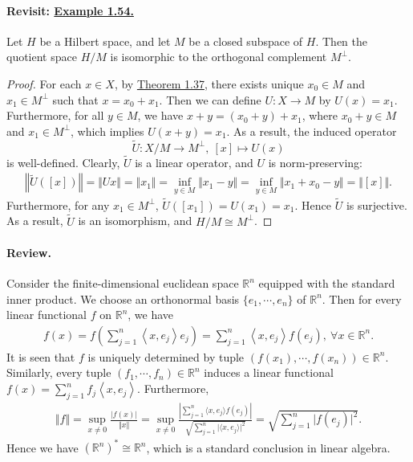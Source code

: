 \documentclass{article}
\begin{document}
\paragraph{Revisit: \hyperref[example:1.54]{Example 1.54.}} Let $H$ be a Hilbert space, and let $M$ be a closed subspace of $H$. Then the quotient space $H/M$ is isomorphic to the orthogonal complement $M^\perp$.
\begin{proof}
For each $x\in X$, by \hyperref[thm:1.37]{Theorem 1.37}, there exists unique $x_0\in M$ and $x_1\in M^\perp$ such that $x=x_0+x_1$. Then we can define $U:X\to M$ by $U(x)=x_1$. Furthermore, for all $y\in M$, we have $x+y=(x_0+y)+x_1$, where $x_0+y\in M$ and $x_1\in M^\perp$, which implies $U(x+y) = x_1$. As a result, the induced operator $$\widetilde{U}:X/M\to M^\perp,\ [x]\mapsto U(x)$$ 
is well-defined. Clearly, $\widetilde{U}$ is a linear operator, and $U$ is norm-preserving:
\begin{align*}
	\left\Vert\widetilde{U}([x])\right\Vert = \Vert Ux\Vert = \Vert x_1\Vert = \inf_{y\in M}\Vert x_1 - y\Vert = \inf_{y\in M}\Vert x_1 + x_0 - y\Vert = \Vert [x]\Vert.
\end{align*}
Furthermore, for any $x_1\in M^\perp$, $\widetilde{U}([x_1]) = U(x_1) = x_1$. Hence $\widetilde{U}$ is surjective. As a result, $\widetilde{U}$ is an isomorphism, and $H/M\cong M^\perp$.
\end{proof}

\paragraph{Review.} Consider the finite-dimensional euclidean space $\mathbb{R}^n$ equipped with the standard inner product. We choose an orthonormal basis $\{e_1,\cdots,e_n\}$ of $\mathbb{R}^n$. Then for every linear functional $f$ on $\mathbb{R}^n$, we have
\begin{align*}
	f(x) = f\left(\sum_{j=1}^n\left\langle x,e_j\right\rangle e_j\right) = \sum_{j=1}^n\left\langle x,e_j\right\rangle f\left(e_j\right),\ \forall x\in\mathbb{R}^n.
\end{align*}
It is seen that $f$ is uniquely determined by tuple $\left(f(x_1),\cdots,f(x_n)\right)\in\mathbb{R}^n$. Similarly, every tuple $(f_1,\cdots,f_n)\in\mathbb{R}^n$ induces a linear functional
$f(x) = \sum_{j=1}^n f_j\left\langle x,e_j\right\rangle$. Furthermore,
\begin{align*}
	\Vert f\Vert = \sup_{x\neq 0}\frac{\vert f(x)\vert}{\Vert x\Vert} = \sup_{x\neq 0}\frac{\left\vert\sum_{j=1}^n\langle x,e_j\rangle f(e_j)\right\vert}{\sqrt{\sum_{j=1}^n\vert\langle x,e_j\rangle\vert^2}} = \sqrt{\sum_{j=1}^n\vert f(e_j)\vert^2}.
\end{align*}
Hence we have $(\mathbb{R}^n)^*\cong\mathbb{R}^n$, which is a standard conclusion in linear algebra.
\end{document}
